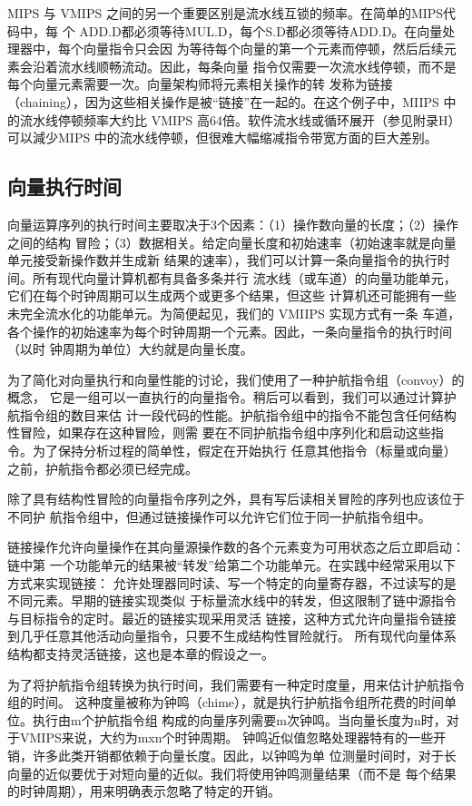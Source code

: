 MIPS 与 VMIPS 之间的另一个重要区别是流水线互锁的频率。在简单的MIPS代码中，每
个 ADD.D都必须等待MUL.D，每个S.D都必须等待ADD.D。在向量处理器中，每个向量指令只会因
为等待每个向量的第一个元素而停顿，然后后续元素会沿着流水线顺畅流动。因此，每条向量
指令仅需要一次流水线停顿，而不是每个向量元素需要一次。向量架构师将元素相关操作的转
发称为链接（chaining），因为这些相关操作是被“链接”在一起的。在这个例子中，MIIPS 中
的流水线停顿频率大约比 VMIPS 高64倍。软件流水线或循环展开（参见附录H）可以減少MIPS
中的流水线停顿，但很难大幅缩减指令带宽方面的巨大差别。

\subsection{向量执行时间}

向量运算序列的执行时间主要取决于3个因素：（1）操作数向量的长度；（2）操作之间的结构
冒险；（3）数据相关。给定向量长度和初始速率（初始速率就是向量单元接受新操作数并生成新
结果的速率），我们可以计算一条向量指令的执行时间。所有现代向量计算机都有具备多条并行
流水线（或车道）的向量功能单元，它们在每个时钟周期可以生成两个或更多个结果，但这些
计算机还可能拥有一些未完全流水化的功能单元。为简便起见，我们的 VMIIPS 实现方式有一条
车道，各个操作的初始速率为每个时钟周期一个元素。因此，一条向量指令的执行时间（以时
钟周期为单位）大约就是向量长度。

为了简化对向量执行和向量性能的讨论，我们使用了一种护航指令组（convoy）的概念，
它是一组可以一直执行的向量指令。稍后可以看到，我们可以通过计算护航指令组的数目来估
计一段代码的性能。护航指令组中的指令不能包含任何结构性冒险，如果存在这种冒险，则需
要在不同护航指令组中序列化和启动这些指令。为了保持分析过程的简单性，假定在开始执行
任意其他指令（标量或向量）之前，护航指令都必须已经完成。

除了具有结构性冒险的向量指令序列之外，具有写后读相关冒险的序列也应该位于不同护
航指令组中，但通过链接操作可以允许它们位于同一护航指令组中。

链接操作允许向量操作在其向量源操作数的各个元素变为可用状态之后立即启动：链中第
一个功能单元的结果被“转发”给第二个功能单元。在实践中经常采用以下方式来实现链接：
允许处理器同时读、写一个特定的向量寄存器，不过读写的是不同元素。早期的链接实现类似
于标量流水线中的转发，但这限制了链中源指令与目标指令的定时。最近的链接实现采用灵活
链接，这种方式允许向量指令链接到几乎任意其他活动向量指令，只要不生成结构性冒险就行。
所有现代向量体系结构都支持灵活链接，这也是本章的假设之一。

为了将护航指令组转换为执行时间，我们需要有一种定时度量，用来估计护航指令组的时间。
这种度量被称为钟鸣（chime），就是执行护航指令组所花费的时间单位。执行由m个护航指令组
构成的向量序列需要m次钟鸣。当向量长度为n时，对于VMIPS来说，大约为mxn个时钟周期。
钟鸣近似值忽略处理器特有的一些开销，许多此类开销都依赖于向量长度。因此，以钟鸣为单
位测量时间时，对于长向量的近似要优于对短向量的近似。我们将使用钟鸣测量结果（而不是
每个结果的时钟周期），用来明确表示忽略了特定的开销。

